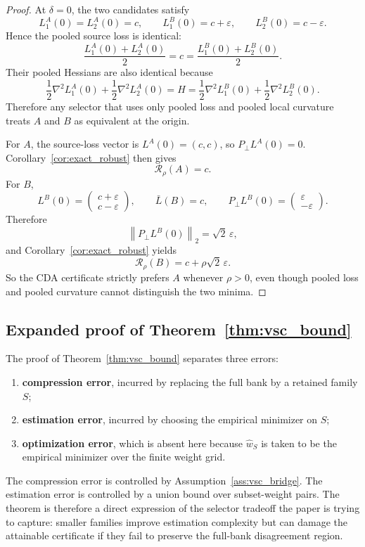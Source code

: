 \documentclass{article}
\theoremstyle{definition}
\newcommand{\eps}{\varepsilon}
\newcommand{\norm}[1]{\left\lVert #1 \right\rVert}
\begin{document}
\begin{proof}
At \(\delta=0\), the two candidates satisfy
\[
L_1^{A}(0)=L_2^{A}(0)=c,
\qquad
L_1^{B}(0)=c+\eps,
\qquad
L_2^{B}(0)=c-\eps.
\]
Hence the pooled source loss is identical:
\[
\frac{L_1^{A}(0)+L_2^{A}(0)}{2}
=
c
=
\frac{L_1^{B}(0)+L_2^{B}(0)}{2}.
\]
Their pooled Hessians are also identical because
\[
\frac{1}{2}\nabla^2 L_1^{A}(0)+\frac{1}{2}\nabla^2 L_2^{A}(0)
=
H
=
\frac{1}{2}\nabla^2 L_1^{B}(0)+\frac{1}{2}\nabla^2 L_2^{B}(0).
\]
Therefore any selector that uses only pooled loss and pooled local curvature treats \(A\) and \(B\) as equivalent at the origin.

For \(A\), the source-loss vector is \(L^{A}(0)=(c,c)\), so \(P_\perp L^{A}(0)=0\). Corollary~\ref{cor:exact_robust} then gives
\[
\mathcal R_\rho(A)=c.
\]
For \(B\),
\[
L^{B}(0)=
\begin{pmatrix}
c+\eps\\
c-\eps
\end{pmatrix},
\qquad
\bar L(B)=c,
\qquad
P_\perp L^{B}(0)=
\begin{pmatrix}
\eps\\
-\eps
\end{pmatrix}.
\]
Therefore
\[
\norm{P_\perp L^{B}(0)}_2=\sqrt{2}\,\eps,
\]
and Corollary~\ref{cor:exact_robust} yields
\[
\mathcal R_\rho(B)=c+\rho\sqrt{2}\,\eps.
\]
So the CDA certificate strictly prefers \(A\) whenever \(\rho>0\), even though pooled loss and pooled curvature cannot distinguish the two minima.
\end{proof}

\subsection{Expanded proof of Theorem~\ref{thm:vsc_bound}}

The proof of Theorem~\ref{thm:vsc_bound} separates three errors:
\begin{enumerate}[leftmargin=1.3em]
    \item \textbf{compression error}, incurred by replacing the full bank by a retained family \(S\);
    \item \textbf{estimation error}, incurred by choosing the empirical minimizer on \(S\);
    \item \textbf{optimization error}, which is absent here because \(\hat w_S\) is taken to be the empirical minimizer over the finite weight grid.
\end{enumerate}
The compression error is controlled by Assumption~\ref{ass:vsc_bridge}. The estimation error is controlled by a union bound over subset-weight pairs. The theorem is therefore a direct expression of the selector tradeoff the paper is trying to capture: smaller families improve estimation complexity but can damage the attainable certificate if they fail to preserve the full-bank disagreement region.
\end{document}
